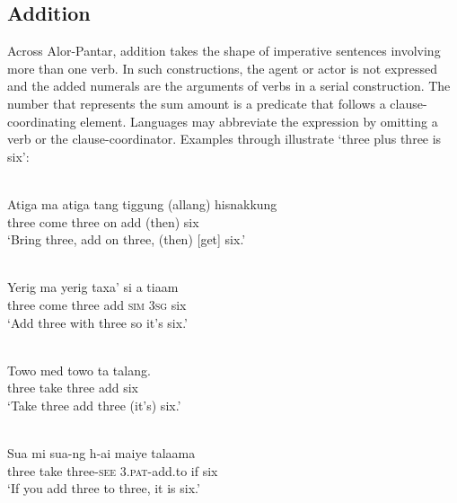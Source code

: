 \documentclass[output=paper]{LSP/langsci}
\begin{document}
\subsection{Addition}
\label{sec:8:Addition}
Across Alor-Pantar, addition takes the shape of imperative sentences involving more than one verb. In such constructions, the agent or actor is not expressed and the added numerals are the arguments of verbs in a serial construction. The number that represents the sum amount is a predicate that follows a clause-coordinating element. Languages may abbreviate the expression by omitting a verb or the clause-coordinator. Examples  through  illustrate `three plus three is six':


\ea%
\label{bkm:Ref342663714}
\\
 
\gll Atiga  ma{\footnotemark}  atiga  tang  tiggung  (allang)  hisnakkung\\  
   three   come  three  on  add  (then)  six \\
\glt  `Bring three, add on three, (then) [get] six.'
\z
{}


\ea
\label{ex:8:1237}
 
\\
 \gll Yerig  ma  yerig  taxa'   si  a  tiaam\\
   three  come  three  add  \textsc{sim  3sg } six \\
 \glt`Add three with three so it's six.'
\z


 

  


\ea
\label{ex:8:1238}
\\ 
 \gll Towo  med  towo  ta  talang.\\
    three   take   three   add   six\\
 \glt `Take three add three (it's) six.'
\z

\ea
\label{ex:8:1239}
\\
 \gll Sua  mi  sua-ng  h-ai  maiye  talaama\\
  three  take  three-\textsc{see}  \textsc{3.pat}{}-add.to  if  six \\
 \glt  `If you add three to three, it is six.'  
\z
\end{document}
